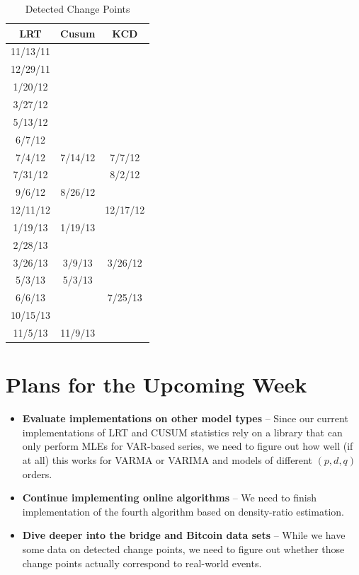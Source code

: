\documentclass[10pt,letterpaper]{article}
\begin{document}
\begin{table}[htbp]
\caption{Detected Change Points}
\begin{center}
\begin{tabular}{|c|c|c|}
\hline
\textbf{LRT} & \textbf{Cusum} & \textbf{KCD} \\ \hline
11/13/11 &  & \\ \hline
12/29/11 &  &  \\ \hline
1/20/12 &  &  \\ \hline
3/27/12 &  &  \\ \hline
5/13/12 &  &  \\ \hline
6/7/12 &  &  \\ \hline
7/4/12 & 7/14/12 & 7/7/12  \\ \hline
7/31/12 &  & 8/2/12 \\ \hline
9/6/12 & 8/26/12 &  \\ \hline
12/11/12 &  & 12/17/12 \\ \hline
1/19/13 & 1/19/13 &  \\ \hline
2/28/13 &  &  \\ \hline
3/26/13 & 3/9/13 & 3/26/12 \\ \hline
5/3/13 & 5/3/13 &  \\ \hline
6/6/13 &  & 7/25/13 \\ \hline
10/15/13 &  &  \\ \hline
11/5/13 & 11/9/13 &  \\ \hline
\end{tabular}
\end{center}
\label{tab:bitcoin}
\end{table}


\section{Plans for the Upcoming Week}

\begin{itemize}
\item \textbf{Evaluate implementations on other model types} -- Since our current implementations of LRT and CUSUM statistics rely on a library that can only perform MLEs for VAR-based series, we need to figure out how well (if at all) this works for VARMA or VARIMA and models of different $(p,d,q)$ orders.
\item \textbf{Continue implementing online algorithms} -- We need to finish implementation of the fourth algorithm based on density-ratio estimation.
\item \textbf{Dive deeper into the bridge and Bitcoin data sets} -- While we have some data on detected change points, we need to figure out whether those change points actually correspond to real-world events.
\end{itemize}

%
%
\end{document}
